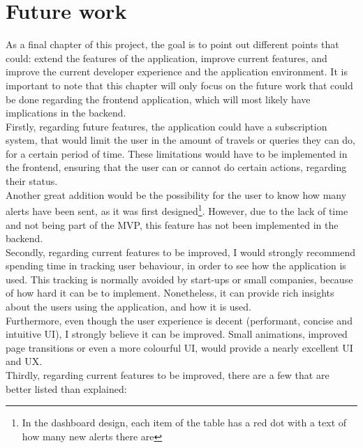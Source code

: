 \documentclass[../memory.tex]{subfiles}
\begin{document}
\chapter{Future work}
As a final chapter of this project, the goal is to point out different points
that could: extend the features of the application, improve current features,
and improve the current developer experience and the application environment. It
is important to note that this chapter will only focus on the future work that
could be done regarding the frontend application, which will most likely have
implications in the backend.
\\[8pt]
Firstly, regarding future features, the application could have a subscription
system, that would limit the user in the amount of travels or queries they can
do, for a certain period of time. These limitations would have to be
implemented in the frontend, ensuring that the user can or cannot do certain
actions, regarding their status.
\\
Another great addition would be the possibility for the user to know how many
alerts have been sent, as it was first designed\footnote{In the dashboard
	design, each item of the table has a red dot with a text of how many new alerts
	there are}. However, due to the lack of time and not being part of the MVP, this
feature has not been implemented in the backend.
\\[8pt]
Secondly, regarding current features to be improved, I would strongly recommend
spending time in tracking user behaviour, in order to see how the application is
used. This tracking is normally avoided by start-ups or small companies, because
of how hard it can be to implement. Nonetheless, it can provide rich insights
about the users using the application, and how it is used.
\\
Furthermore, even though the user experience is decent (performant, concise and
intuitive UI), I strongly believe it can be improved. Small animations, improved
page transitions or even a more colourful UI, would provide a nearly excellent
UI and UX.
\\[8pt]
Thirdly, regarding current features to be improved, there are a few that are
better listed than explained:
\end{document}
